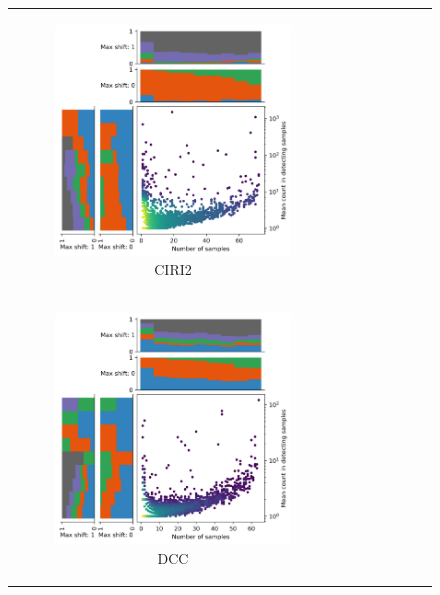 \begin{figure}[ht]
\begin{tabular}{cc}
\begin{subfigure}{.4\textwidth}
            \includegraphics[width=\linewidth]{chapters/4_results_and_discussion/figures/detection/density/ciri2.png}
            \caption{CIRI2} \label{fig:detection_density_ciri2}
        \end{subfigure}
        \\
        \begin{subfigure}{.4\textwidth} \centering

            \includegraphics[width=\linewidth]{chapters/4_results_and_discussion/figures/detection/density/dcc.png}
            \caption{DCC} \label{fig:detection_density_dcc}
        \end{subfigure}           &
        \begin{subfigure}{.4\textwidth} \centering


\end{subfigure}
\end{tabular}
\end{figure}

